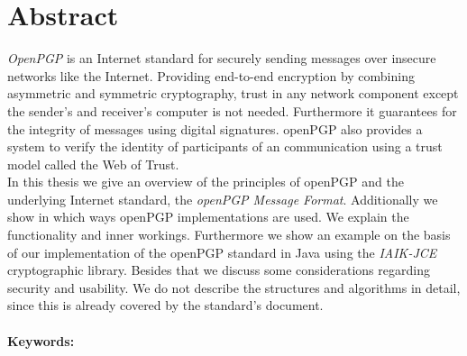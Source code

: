 

\chapter*{Abstract}
\label{cha:abstract}


\emph{OpenPGP} is an Internet standard for securely sending messages over insecure networks like the Internet. Providing end-to-end encryption by combining asymmetric and symmetric cryptography, trust in any network component except the sender's and receiver's computer is not needed. Furthermore it guarantees for the integrity of messages using digital signatures. openPGP also provides a system to verify the identity of participants of an communication using a trust model called the Web of Trust. \\


In this thesis we give an overview of the principles of openPGP and the underlying Internet standard, the\textit{ openPGP Message Format}. 
Additionally we show in which ways openPGP implementations are used.
We explain the functionality and inner workings. Furthermore we show an example on the basis of our implementation of the openPGP standard in Java using the \emph{IAIK-JCE} cryptographic library.
Besides that we discuss some considerations regarding security and usability. 
We do not describe the structures and algorithms in detail, since this is already covered by the standard's document. \\
\\



\textbf{Keywords:} \mykeywords

